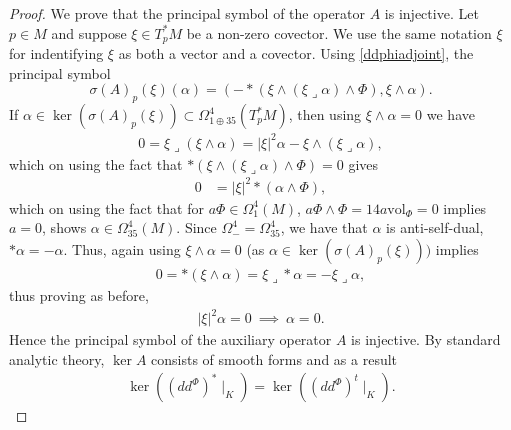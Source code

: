 \documentclass[10pt,a4paper]{amsart}
\def\ddphi{dd^{\Phi}}
\newcommand{\vol}{\mathrm{vol}}
\begin{document}
\begin{proof}
We prove that the principal symbol of the operator $A$ is injective. Let $p\in M$ and suppose $\xi\in T^*_pM$ be a non-zero covector. We use the same notation $\xi$ for indentifying $\xi$ as both a vector and a covector. Using \cref{ddphiadjoint}, the principal symbol $$\sigma(A)_p(\xi)(\alpha)=\left(-*(\xi\wedge(\xi\lrcorner \alpha)\wedge \Phi), \xi\wedge \alpha \right).$$If $\alpha\in \ker(\sigma(A)_p(\xi))\subset \Omega^4_{1\oplus 35}(T^*_pM)$, then using $\xi\wedge \alpha=0$ we have
\begin{align*}
0=\xi\lrcorner(\xi \wedge \alpha) = |\xi|^2\alpha - \xi\wedge(\xi\lrcorner \alpha),
\end{align*}
which on using the fact that $*(\xi\wedge(\xi\lrcorner \alpha)\wedge \Phi)=0$ gives
\begin{align*}
0&= |\xi|^2*(\alpha \wedge \Phi),
\end{align*}
which on using the fact that for $a\Phi\in \Omega^4_1(M)$, $a\Phi\wedge \Phi=14a\vol_{\Phi}=0$ implies $a=0$, shows $\alpha \in \Omega^4_{35}(M)$. Since $\Omega^4_{-}=\Omega^4_{35}$, we have that $\alpha$ is anti-self-dual, $*\alpha=-\alpha$. Thus, again using $\xi\wedge \alpha=0$ (as $\alpha \in \ker(\sigma(A)_p(\xi)))$ implies
\begin{align*}
0=*(\xi\wedge \alpha)=\xi\lrcorner *\alpha = -\xi \lrcorner \alpha,
\end{align*}
thus proving as before,
\begin{align*}
|\xi|^2\alpha=0\ \implies\ \alpha=0.
\end{align*}
Hence the principal symbol of the auxiliary operator $A$ is injective. By standard analytic theory, $\ker A$ consists of smooth forms and as a result
\begin{align*}
\ker \left((\ddphi)^*\mid_{K} \right)=\ker \left((\ddphi)^t\mid_{K} \right).
\end{align*}

\medskip


\end{proof}
\end{document}
